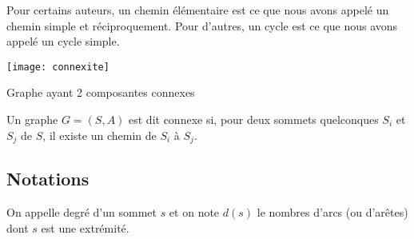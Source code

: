 \begin{rem}
Pour certains auteurs, un chemin élémentaire est ce que nous avons appelé un chemin simple et réciproquement. Pour d’autres, un cycle est ce que nous avons appelé un cycle simple.
\end{rem}

%
%
%
%


%


\begin{marginfigure}
\centering
\texttt{[image: connexite]}
\caption{Graphe ayant 2 composantes connexes}
\end{marginfigure}

\begin{defi}
Un graphe $G=(S,A)$ est dit connexe si, pour deux sommets quelconques $S_i$ et $S_j$ de $S$, il existe un chemin de $S_i$ à $S_j$.
\end{defi}


\subsection{Notations}
\begin{defi}
On appelle degré d'un sommet $s$ et on note $d\left(s\right)$ le nombres d'arcs (ou d'arêtes) dont $s$ est une extrémité.
\end{defi}

